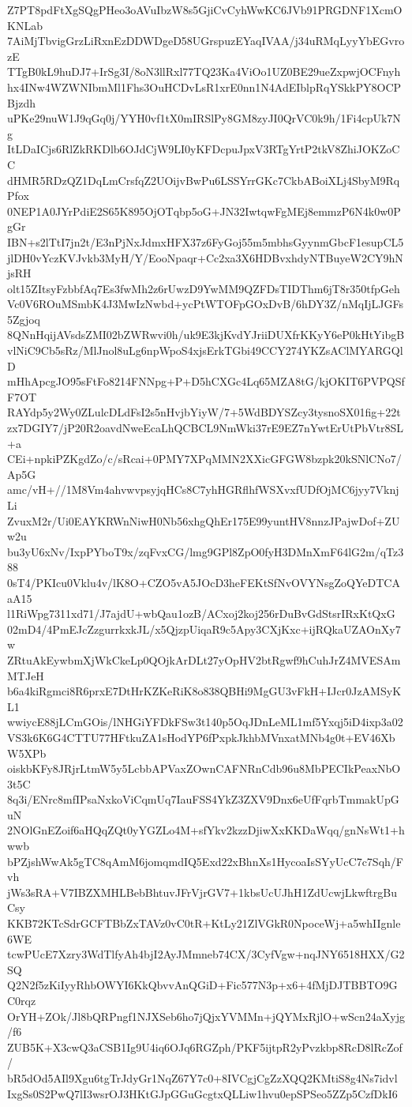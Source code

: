 Z7PT8pdFtXgSQgPHeo3oAVuIbzW8s5GjiCvCyhWwKC6JVb91PRGDNF1XcmOKNLab
7AiMjTbvigGrzLiRxnEzDDWDgeD58UGrspuzEYaqIVAA/j34uRMqLyyYbEGvrozE
TTgB0kL9huDJ7+IrSg3I/8oN3llRxl77TQ23Ka4ViOo1UZ0BE29ueZxpwjOCFnyh
hx4INw4WZWNIbmMl1Fhs3OuHCDvLsR1xrE0nn1N4AdEIblpRqYSkkPY8OCPBjzdh
uPKe29nuW1J9qGq0j/YYH0vf1tX0mIRSlPy8GM8zyJI0QrVC0k9h/1Fi4cpUk7Ng
ItLDaICjs6RlZkRKDlb6OJdCjW9LI0yKFDcpuJpxV3RTgYrtP2tkV8ZhiJOKZoCC
dHMR5RDzQZ1DqLmCrsfqZ2UOijvBwPu6LSSYrrGKc7CkbABoiXLj4SbyM9RqPfox
0NEP1A0JYrPdiE2S65K895OjOTqbp5oG+JN32IwtqwFgMEj8emmzP6N4k0w0PgGr
IBN+s2lTtI7jn2t/E3nPjNxJdmxHFX37z6FyGoj55m5mbhsGyynmGbcF1esupCL5
jlDH0vYczKVJvkb3MyH/Y/EooNpaqr+Cc2xa3X6HDBvxhdyNTBuyeW2CY9hNjsRH
olt15ZItsyFzbbfAq7Es3fwMh2z6rUwzD9YwMM9QZFDsTIDThm6jT8r350tfpGeh
Vc0V6ROuMSmbK4J3MwIzNwbd+ycPtWTOFpGOxDvB/6hDY3Z/nMqIjLJGFs5Zgjoq
8QNnHqijAVsdsZMI02bZWRwvi0h/uk9E3kjKvdYJriiDUXfrKKyY6eP0kHtYibgB
vlNiC9Cb5sRz/MlJnol8uLg6npWpoS4xjsErkTGbi49CCY274YKZsAClMYARGQlD
mHhApcgJO95sFtFo8214FNNpg+P+D5hCXGc4Lq65MZA8tG/kjOKIT6PVPQSfF7OT
RAYdp5y2Wy0ZLulcDLdFsI2s5nHvjbYiyW/7+5WdBDYSZcy3tysnoSX01fig+22t
zx7DGIY7/jP20R2oavdNweEcaLhQCBCL9NmWki37rE9EZ7nYwtErUtPbVtr8SL+a
CEi+npkiPZKgdZo/c/sRcai+0PMY7XPqMMN2XXicGFGW8bzpk20kSNlCNo7/Ap5G
amc/vH+//1M8Vm4ahvwvpsyjqHCs8C7yhHGRflhfWSXvxfUDfOjMC6jyy7VknjLi
ZvuxM2r/Ui0EAYKRWnNiwH0Nb56xhgQhEr175E99yuntHV8nnzJPajwDof+ZUw2u
bu3yU6xNv/IxpPYboT9x/zqFvxCG/lmg9GPl8ZpO0fyH3DMnXmF64lG2m/qTz388
0sT4/PKIcu0Vklu4v/lK8O+CZO5vA5JOcD3heFEKtSfNvOVYNsgZoQYeDTCAaA15
l1RiWpg7311xd71/J7ajdU+wbQau1ozB/ACxoj2koj256rDuBvGdStsrIRxKtQxG
02mD4/4PmEJcZzgurrkxkJL/x5QjzpUiqaR9c5Apy3CXjKxc+ijRQkaUZAOnXy7w
ZRtuAkEywbmXjWkCkeLp0QOjkArDLt27yOpHV2btRgwf9hCuhJrZ4MVESAmMTJeH
b6a4kiRgmci8R6prxE7DtHrKZKeRiK8o838QBHi9MgGU3vFkH+IJcr0JzAMSyKL1
wwiycE88jLCmGOis/lNHGiYFDkFSw3t140p5OqJDnLeML1mf5Yxqj5iD4ixp3a02
VS3k6K6G4CTTU77HFtkuZA1sHodYP6fPxpkJkhbMVnxatMNb4g0t+EV46XbW5XPb
oiskbKFy8JRjrLtmW5y5LcbbAPVaxZOwnCAFNRnCdb96u8MbPECIkPeaxNbO3t5C
8q3i/ENrc8mfIPsaNxkoViCqmUq7IauFSS4YkZ3ZXV9Dnx6eUfFqrbTmmakUpGuN
2NOlGnEZoif6aHQqZQt0yYGZLo4M+sfYkv2kzzDjiwXxKKDaWqq/gnNsWt1+hwwb
bPZjshWwAk5gTC8qAmM6jomqmdIQ5Exd22xBhnXs1HycoaIsSYyUcC7c7Sqh/Fvh
jWs3sRA+V7IBZXMHLBebBhtuvJFrVjrGV7+1kbsUcUJhH1ZdUcwjLkwftrgBuCsy
KKB72KTcSdrGCFTBbZxTAVz0vC0tR+KtLy21ZlVGkR0NpoceWj+a5whIIgnle6WE
tcwPUcE7Xzry3WdTlfyAh4bjI2AyJMmneb74CX/3CyfVgw+nqJNY6518HXX/G2SQ
Q2N2f5zKiIyyRhbOWYI6KkQbvvAnQGiD+Fic577N3p+x6+4fMjDJTBBTO9GC0rqz
OrYH+ZOk/Jl8bQRPngf1NJXSeb6ho7jQjxYVMMn+jQYMxRjlO+wScn24aXyjg/f6
ZUB5K+X3cwQ3aCSB1Ig9U4iq6OJq6RGZph/PKF5ijtpR2yPvzkbp8RcD8lRcZof/
bR5dOd5AIl9Xgu6tgTrJdyGr1NqZ67Y7c0+8IVCgjCgZzXQQ2KMtiS8g4Ns7idvl
IxgSs0S2PwQ7lI3wsrOJ3HKtGJpGGuGcgtxQLLiw1hvu0epSPSeo5ZZp5CzfDkI6
